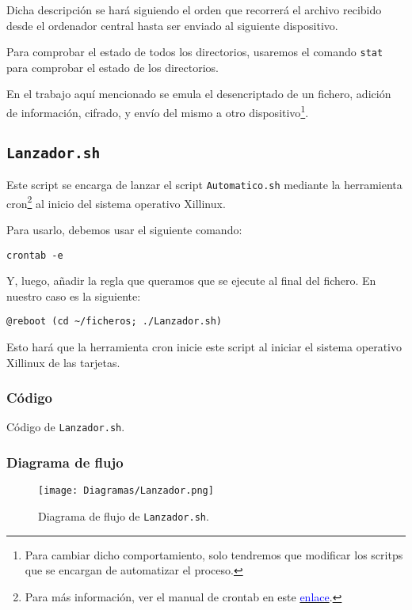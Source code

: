 \documentclass[12pt,letterpaper]{article}
\begin{document}
Dicha descripción se hará siguiendo el orden que recorrerá el archivo recibido desde el ordenador central hasta ser enviado al siguiente dispositivo.

Para comprobar el estado de todos los directorios, usaremos el comando \texttt{stat} para comprobar el estado de los directorios.

En el trabajo aquí mencionado se emula el desencriptado de un fichero, adición de información, cifrado, y envío del mismo a otro dispositivo\footnote{Para cambiar dicho comportamiento, solo tendremos que modificar los scritps que se encargan de automatizar el proceso.}.


\subsection{\texttt{Lanzador.sh}}
Este script se encarga de lanzar el script \texttt{Automatico.sh} mediante la herramienta cron\footnote{Para más información, ver el manual de crontab en este \href{https://linux.die.net/man/5/crontab}{\textcolor{blue}{enlace}}.} al inicio del sistema operativo Xillinux.

Para usarlo, debemos usar el siguiente comando:
\begin{center}
	\texttt{crontab -e}
\end{center}

Y, luego, añadir la regla que queramos que se ejecute al final del fichero. En nuestro caso es la siguiente:
\begin{center}
	\texttt{@reboot (cd \textasciitilde/ficheros; ./Lanzador.sh)}
\end{center}

Esto hará que la herramienta cron inicie este script al iniciar el sistema operativo Xillinux de las tarjetas.
\subsubsection{Código}

\begin{center}
	Código de \texttt{Lanzador.sh}.
\end{center}

\newpage
\subsubsection{Diagrama de flujo}
\begin{figure}[h]
	\centering
	\texttt{[image: Diagramas/Lanzador.png]}
	\caption{Diagrama de flujo de \texttt{Lanzador.sh}.}
	\label{Diagrama de flujo de Lanzador.sh}
\end{figure}
\end{document}
